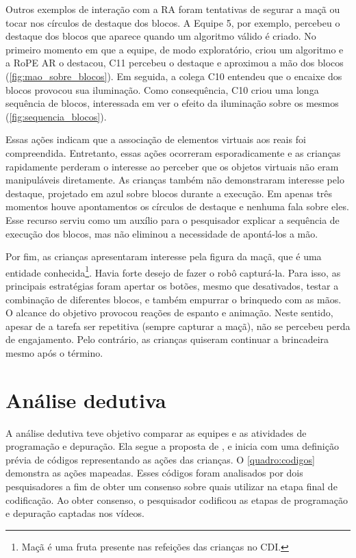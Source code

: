 Outros exemplos de interação com a RA foram tentativas de segurar a maçã ou tocar nos círculos de destaque dos blocos. A Equipe 5, por exemplo, percebeu o destaque dos blocos que aparece quando um algoritmo válido é criado. No primeiro momento em que a equipe, de modo exploratório, criou um algoritmo e a RoPE AR o destacou, C11 percebeu o destaque e aproximou a mão dos blocos (\autoref{fig:mao_sobre_blocos}). Em seguida, a colega C10 entendeu que o encaixe dos blocos provocou sua iluminação. Como consequência, C10 criou uma longa sequência de blocos, interessada em ver o efeito da iluminação sobre os mesmos  (\autoref{fig:sequencia_blocos}).

Essas ações indicam que a associação de elementos virtuais aos reais foi compreendida. Entretanto, essas ações ocorreram esporadicamente e as crianças rapidamente perderam o interesse ao perceber que os objetos virtuais não eram manipuláveis diretamente. As crianças também não demonstraram interesse pelo destaque, projetado em azul sobre blocos durante a execução. Em apenas três momentos houve apontamentos os círculos de destaque e nenhuma fala sobre eles. Esse recurso serviu como um auxílio para o pesquisador explicar a sequência de execução dos blocos, mas não eliminou a necessidade de apontá-los a mão.

Por fim, as crianças apresentaram interesse pela figura da maçã, que é uma entidade conhecida\footnote{Maçã é uma fruta presente nas refeições das crianças no CDI.}. Havia forte desejo de fazer o robô capturá-la. Para isso, as principais estratégias foram apertar os botões, mesmo que desativados, testar a combinação de diferentes blocos, e também empurrar o brinquedo com as mãos. O alcance do objetivo provocou reações de espanto e animação. Neste sentido, apesar de a tarefa ser repetitiva (sempre capturar a maçã), não se percebeu perda de engajamento. Pelo contrário, as crianças quiseram continuar a brincadeira mesmo após o término.

\section{Análise dedutiva}

A análise dedutiva teve objetivo comparar as equipes e as atividades de programação e depuração. Ela segue a proposta de , e inicia com uma definição prévia de códigos representando as ações das crianças. O \autoref{quadro:codigos} demonstra as ações mapeadas. 
Esses códigos foram analisados por dois pesquisadores a fim de obter um consenso sobre quais utilizar na etapa final de codificação. Ao obter consenso, o pesquisador codificou as etapas de programação e depuração captadas nos vídeos.

